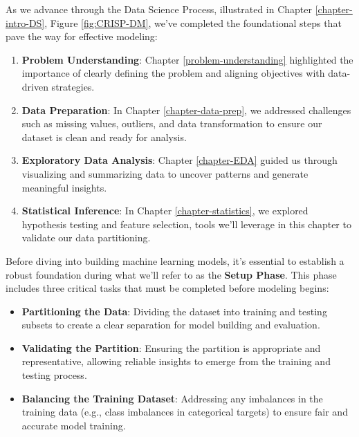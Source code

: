 \documentclass[
]{book}
\providecommand{\tightlist}{%
  \setlength{\itemsep}{0pt}\setlength{\parskip}{0pt}}
\theoremstyle{definition}
\theoremstyle{definition}
\theoremstyle{definition}
\theoremstyle{definition}
\theoremstyle{remark}
\begin{document}
As we advance through the Data Science Process, illustrated in Chapter \ref{chapter-intro-DS}, Figure \ref{fig:CRISP-DM}, we've completed the foundational steps that pave the way for effective modeling:

\begin{enumerate}
\def\labelenumi{\arabic{enumi}.}
\tightlist
\item
  \textbf{Problem Understanding}: Chapter \ref{problem-understanding} highlighted the importance of clearly defining the problem and aligning objectives with data-driven strategies.\\
\item
  \textbf{Data Preparation}: In Chapter \ref{chapter-data-prep}, we addressed challenges such as missing values, outliers, and data transformation to ensure our dataset is clean and ready for analysis.\\
\item
  \textbf{Exploratory Data Analysis}: Chapter \ref{chapter-EDA} guided us through visualizing and summarizing data to uncover patterns and generate meaningful insights.\\
\item
  \textbf{Statistical Inference}: In Chapter \ref{chapter-statistics}, we explored hypothesis testing and feature selection, tools we'll leverage in this chapter to validate our data partitioning.
\end{enumerate}

Before diving into building machine learning models, it's essential to establish a robust foundation during what we'll refer to as the \textbf{Setup Phase}. This phase includes three critical tasks that must be completed before modeling begins:

\begin{itemize}
\tightlist
\item
  \textbf{Partitioning the Data}: Dividing the dataset into training and testing subsets to create a clear separation for model building and evaluation.\\
\item
  \textbf{Validating the Partition}: Ensuring the partition is appropriate and representative, allowing reliable insights to emerge from the training and testing process.\\
\item
  \textbf{Balancing the Training Dataset}: Addressing any imbalances in the training data (e.g., class imbalances in categorical targets) to ensure fair and accurate model training.
\end{itemize}
\end{document}
